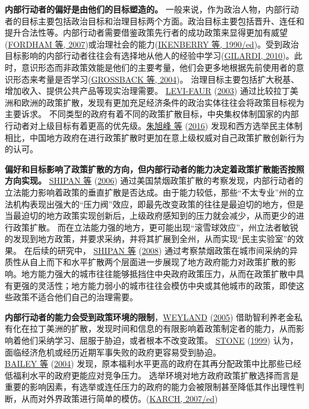\documentclass[
  12pt,
]{ctexart}
\begin{document}
\textbf{内部行动者的偏好是由他们的目标塑造的。}
一般来说，作为政治人物，内部行动者的目标主要包括政治目标和治理目标两个方面。政治目标主要包括晋升、连任和提升合法性等。内部行动者需要借鉴政策先行者的成功政策来显得更加有威望(\protect\hyperlink{ref-FordhamAsal2007}{FORDHAM 等, 2007})或治理社会的能力(\protect\hyperlink{ref-IkenberryKupchan1990}{IKENBERRY 等, 1990/ed})。受到政治目标影响的内部行动者往往会有选择地从他人的经验中学习(\protect\hyperlink{ref-Gilardi2010b}{GILARDI, 2010})。此时，意识形态而非政策效能是他们的主要考量，他们会更多地根据先前使用者的意识形态来考量是否学习(\protect\hyperlink{ref-GrossbackEtAl2004a}{GROSSBACK 等, 2004})。
治理目标主要包括扩大税基、增加收入、提供公共产品等现实治理需要。 \protect\hyperlink{ref-Levi-Faur2003}{LEVI-FAUR} (\protect\hyperlink{ref-Levi-Faur2003}{2003}) 通过比较拉丁美洲和欧洲的政策扩散，发现有更加充足经济条件的政治实体往往会将政策目标视为主要诉求。
不同类型的政府有着不同的政策扩散目标，中央集权体制国家的内部行动者对上级目标有着更高的优先级。\protect\hyperlink{ref-ZhuXuFengZhaoHui2016}{朱旭峰 等} (\protect\hyperlink{ref-ZhuXuFengZhaoHui2016}{2016}) 发现和西方选举民主体制相比，中国地方政府在进行政策扩散时更加在意上级权威对自己政策扩散创新行为的认可。

\textbf{偏好和目标影响了政策扩散的方向，但内部行动者的能力决定着政策扩散能否按照方向实现。}
\protect\hyperlink{ref-ShipanVolden2006}{SHIPAN 等} (\protect\hyperlink{ref-ShipanVolden2006}{2006}) 通过美国禁烟政策扩散的考察发现，内部行动者的立法能力影响着政策的垂直扩散是否达成。由于能力较低，那些``不太专业''州的立法机构表现出强大的``压力阀''效应，即最先改变政策的往往是最迫切的地方，但是当最迫切的地方政策实现创新后，上级政府感知到的压力就会减少，从而更少的进行政策扩散。
而在立法能力强的地方，更可能出现``滚雪球效应''，州立法者敏锐的发现到地方政策，并要求采纳，并将其扩展到全州，从而实现``民主实验室''的效果。
在后续的研究中， \protect\hyperlink{ref-ShipanVolden2008}{SHIPAN 等} (\protect\hyperlink{ref-ShipanVolden2008}{2008}) 通过考察禁烟政策在城市间采纳的异质性从自上而下和水平扩散两个层面进一步展现了地方政府能力对政策扩散的影响。地方能力强大的城市往往能够抵挡住中央政府政策压力，从而在政策扩散中具有更强的灵活性；地方能力弱小的城市往往会模仿中央或其他城市的政策，即使这些政策不适合他们自己的治理需要。

\textbf{内部行动者的能力会受到政策环境的限制}，\protect\hyperlink{ref-Weyland2005a}{WEYLAND} (\protect\hyperlink{ref-Weyland2005a}{2005}) 借助智利养老金私有化在拉丁美洲的扩散，发现时间和信息的有限影响着政策制定者的能力，从而影响着他们采纳学习、屈服于胁迫，或者根本不改变政策。
\protect\hyperlink{ref-Stone1999}{STONE} (\protect\hyperlink{ref-Stone1999}{1999}) 认为，面临经济危机或经历近期军事失败的政府更容易受到胁迫。\\
\protect\hyperlink{ref-BaileyRom2004}{BAILEY 等} (\protect\hyperlink{ref-BaileyRom2004}{2004}) 发现，原本福利水平更高的政府在其再分配政策中比那些已经低福利水平的政府更能应对竞争压力。
选举环境对地方政府政策扩散选择而言是重要的影响因素，有选举或连任压力的政府的能力会被限制甚至降低其作出理性判断，从而对外界政策进行简单的模仿。(\protect\hyperlink{ref-Karch2007a}{KARCH, 2007/ed})
\end{document}
